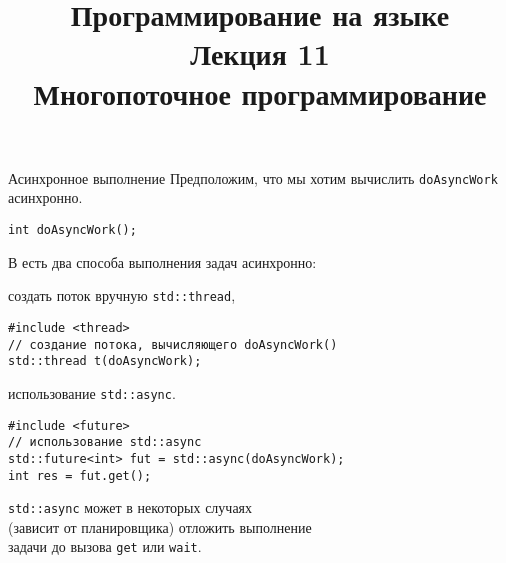 \documentclass[aspectration=1610,t]{beamer}
\title{{\bf Программирование на языке \langcpp\protect\\Лекция
11\protect\vspace{1em}\\}Многопоточное программирование}
\begin{document}
\begin{frame} 
  \titlepage
\end{frame}

\begin{frame}[fragile]{Асинхронное выполнение}
Предположим, что мы хотим вычислить \texttt{doAsyncWork} асинхронно.
\begin{lstlisting}
int doAsyncWork();
\end{lstlisting}

В \langcpp есть два способа выполнения задач асинхронно:\medskip

\fakeitem создать поток вручную \texttt{std::thread},
   
\begin{lstlisting}
#include <thread>
// создание потока, вычисляющего doAsyncWork()
std::thread t(doAsyncWork);
\end{lstlisting}

\fakeitem использование \texttt{std::async}.
\begin{lstlisting}
#include <future>
// использование std::async
std::future<int> fut = std::async(doAsyncWork);
int res = fut.get();
\end{lstlisting}

\texttt{std::async} может в некоторых случаях \\(зависит от планировщика) отложить выполнение\\ задачи до вызова \texttt{get} или \texttt{wait}.
\end{frame}
\end{document}
